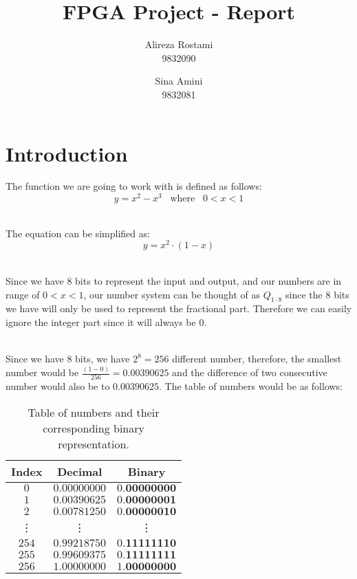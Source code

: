 \documentclass{article}
\title{FPGA Project - Report}
\author{Alireza Rostami \\ 9832090 \and Sina Amini \\ 9832081}
\date{}
\let\oldsection\section
\renewcommand{\section}{%
    \setcounter{subsection}{0}%
    \oldsection%
}
\begin{document}
    \maketitle
    \section{Introduction}
    The function we are going to work with is defined as follows:
    \begin{equation}
        y = x^2 - x^3 \; \; \; \text{where} \;\;\; 0<x<1
    \end{equation}
    
    ~\\The equation can be simplified as:
    \begin{equation}
        y = x^2 \cdot (1 - x)
    \end{equation}
    
    ~\\Since we have $ 8 $ bits to represent the input and output, and our numbers are in range of $0 < x < 1$, our number system can be thought of as $ Q_{1 \cdot 8}$ since the $ 8 $ bits we have will only be used to represent the fractional part. Therefore we can easily ignore the integer part since it will always be $ 0 $.
    
    ~\\Since we have $ 8 $ bits, we have $2^8 = 256$ different number, therefore, the smallest number would be $\frac{(1-0)}{256} = 0.00390625$ and the difference of two consecutive number would also be to $0.00390625$. The table of numbers would be as follows:
    \begin{table}[h!]
        \centering
        \begin{tabular}{|c|c|c|}
            \hline
            Index & Decimal & Binary \\
            \hline
            $ 0 $ & $ 0.00000000 $ & $ 0.\boldsymbol{00000000} $  \\ 
            \hline
            $ 1 $ & $ 0.00390625 $ & $ 0.\boldsymbol{00000001} $  \\ 
            \hline
            $ 2 $ & $ 0.00781250 $ & $ 0.\boldsymbol{00000010} $  \\ 
            \hline
            \vdots & \vdots & \vdots \\
            \hline
            $ 254 $ & $ 0.99218750 $ & $ 0.\boldsymbol{11111110} $  \\
            \hline
            $ 255 $ & $ 0.99609375 $ & $ 0.\boldsymbol{11111111} $  \\ 
            \hline
            $ 256 $ & $ 1.00000000 $ & $ 1.\boldsymbol{00000000} $  \\ 
            \hline
        \end{tabular}
        \caption{Table of numbers and their corresponding binary representation.}
        \label{table:table_of_numbers}
    \end{table}
    
\end{document}
